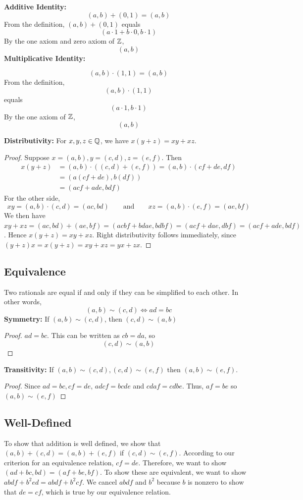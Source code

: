 \noindent\textbf{Additive Identity: }
\[
(a,b)+(0,1) = (a,b)
\]
From the definition, $(a,b)+(0,1)$ equals 
\[
(a\cdot 1+b\cdot 0, b\cdot 1)
\]
By the one axiom and zero axiom of $\mathbb{Z}$,
\[
(a,b)
\]
\noindent\textbf{Multiplicative Identity: }

\[
(a,b)\cdot(1,1) = (a,b)
\]
From the definition, $$(a,b)\cdot(1,1)$$ equals
\[
(a\cdot1,b\cdot1)
\]
By the one axiom of $\mathbb{Z}$, 
\[(a,b)\]
 
\noindent\textbf{Distributivity: }
For $x,y,z\in \mathbb{Q}$, we have $x(y+z)=xy+xz$. 
\begin{proof}
Suppose $x=(a,b),y=(c,d),z=(e,f)$. Then
\begin{align*}
x(y+z)&=(a,b)\cdot((c,d)+(e,f))=(a,b)\cdot(cf+de,df)\\
&=(a(cf+de),b(df)) \\
&=(acf+ade,bdf) 
\end{align*}
For the other side, 
\[xy=(a,b)\cdot(c,d)=(ac,bd) \qquad \text{and}\qquad xz=(a,b)\cdot(e,f)=(ae,bf)\]
 We then have $xy+xz=(ac,bd)+(ae,bf)=(acbf+bdae,bdbf)=(acf+dae,dbf)=(acf+ade,bdf)$. Hence $x(y+z)=xy+xz$. Right distributivity follows immediately, since $(y+z)x=x(y+z)=xy+xz=yx+zx$.

\end{proof}

\subsection{Equivalence}
Two rationals are equal if and only if they can be simplified to each other. In other words, 
\[
(a,b)\sim(c,d) \Leftrightarrow ad=bc
\]
\noindent\textbf{Symmetry: } If $(a,b)\sim(c,d)$, then $(c,d)\sim(a,b)$
\begin{proof}
    $ad=bc$. This can be written as $cb=da$, so 
\[
(c,d)\sim(a,b)
\]
\end{proof}
\noindent\textbf{Transitivity: } If $(a,b)\sim(c,d),(c,d)\sim(e,f)$ then $(a,b)\sim(e,f)$.
\begin{proof}
    Since $ad=bc, cf=de$, $adcf=bcde$ and $cdaf=cdbe$. Thus, $af=be$ so $(a,b)\sim(e,f)$
\end{proof}

\subsection{Well-Defined}
To show that addition is well defined, we show that $(a,b) + (c,d) = (a,b)+(e,f)$ if $(c,d) \sim (e,f)$. According to our criterion for an equivalence relation, $cf = de$. Therefore, we want to show $(ad+bc, bd) = (af+be, bf)$. To show these are equivalent, we want to show $abdf+b^2ed=abdf+b^2cf$. We cancel $abdf$ and $b^2$ because $b$ is nonzero to show that $de=cf$, which is true by our equivalence relation. \\

